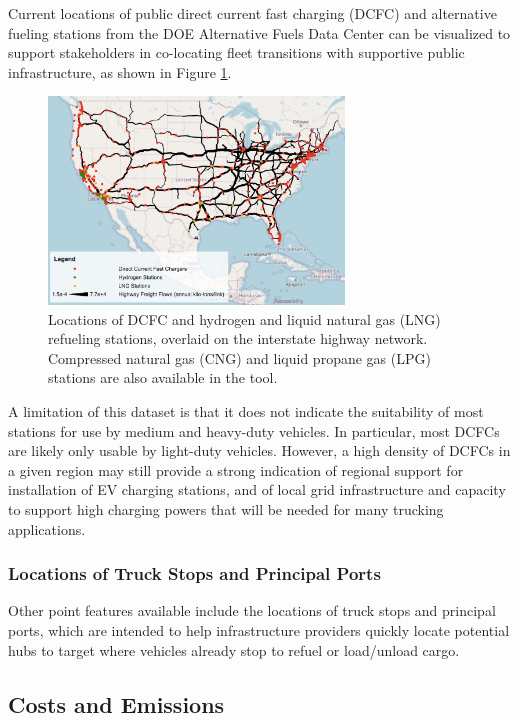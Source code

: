 Current locations of public direct current fast charging (DCFC) and alternative fueling stations from the DOE Alternative Fuels Data Center \cite{AFDC_2024} can be visualized to support stakeholders in co-locating fleet transitions with supportive public infrastructure, as shown in Figure \ref{fig:stations}.

\begin{figure}[ht]
        \centering
        \includegraphics[width=0.7\textwidth]{figures/stations.png}
        \caption{Locations of DCFC and hydrogen and liquid natural gas (LNG) refueling stations, overlaid on the interstate highway network. Compressed natural gas (CNG) and liquid propane gas (LPG) stations are also available in the tool.}
        \label{fig:stations}
\end{figure}

A limitation of this dataset is that it does not indicate the suitability of most stations for use by medium and heavy-duty vehicles. In particular, most DCFCs are likely only usable by light-duty vehicles. However, a high density of DCFCs in a given region may still provide a strong indication of regional support for installation of EV charging stations, and of local grid infrastructure and capacity to support high charging powers that will be needed for many trucking applications.  

\subsubsection{Locations of Truck Stops and Principal Ports}

Other point features available include the locations of truck stops and principal ports, which are intended to help infrastructure providers quickly locate potential hubs to target where vehicles already stop to refuel or load/unload cargo. 

\subsection{Costs and Emissions}

